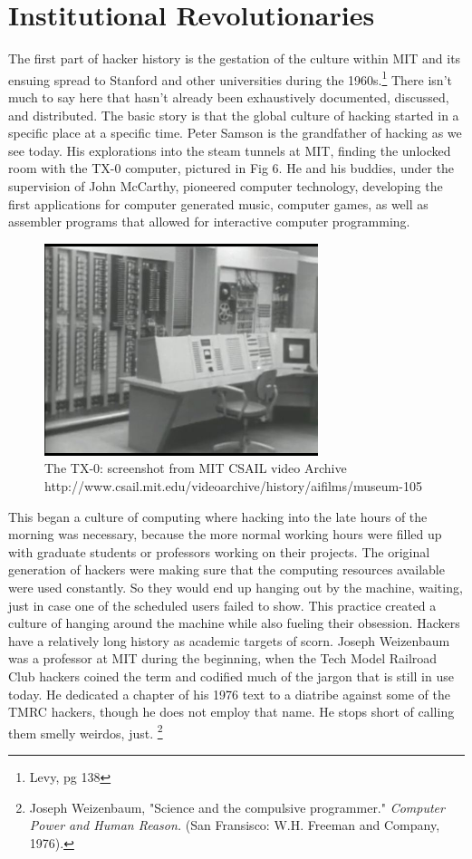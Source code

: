 \documentclass[11pt]{article}
\begin{document}
\newpage
\section{Institutional Revolutionaries}

The first part of hacker history is the gestation of the culture within MIT and its ensuing spread to Stanford and other universities during the 1960s.\footnote{Levy, pg 138} There isn't much to say here that hasn't already been exhaustively documented, discussed, and distributed. The basic story is that the global culture of hacking started in a specific place at a specific time. Peter Samson is the grandfather of hacking as we see today. His explorations into the steam tunnels at MIT, finding the unlocked room with the TX-0 computer, pictured in Fig 6. He and his buddies, under the supervision of John McCarthy, pioneered computer technology, developing the first applications for computer generated music, computer games, as well as assembler programs that allowed for interactive computer programming.

\begin{figure}[ht!]
\center
\includegraphics[width=80mm]{TX-0.jpg}
\caption{The TX-0: screenshot from MIT CSAIL video Archive http://www.csail.mit.edu/videoarchive/history/aifilms/museum-105}
\end{figure}

This began a culture of computing where hacking into the late hours of the morning was necessary, because the more normal working hours were filled up with graduate students or professors working on their projects. The original generation of hackers were making sure that the computing resources available were used constantly. So they would end up hanging out by the machine, waiting, just in case one of the scheduled users failed to show. This practice created a culture of hanging around the machine while also fueling their obsession. Hackers have a relatively long history as academic targets of scorn. Joseph Weizenbaum was a professor at MIT during the beginning, when the Tech Model Railroad Club hackers coined the term and codified much of the jargon that is still in use today. He dedicated a chapter of his 1976 text to a diatribe against some of the TMRC hackers, though he does not employ that name. He stops short of calling them smelly weirdos, just.
\footnote{Joseph Weizenbaum, "Science and the compulsive programmer." \emph{Computer Power and Human Reason.} (San Fransisco: W.H. Freeman and Company, 1976).}  
\end{document}

